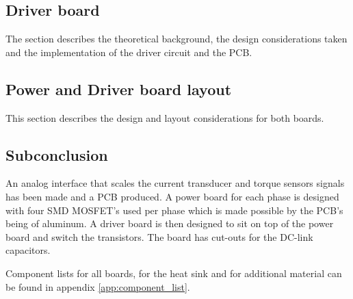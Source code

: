 \subsection{Driver board}
The section describes the theoretical background, the design considerations taken and the implementation of the driver circuit and the PCB.



\subsection{Power and Driver board layout}
This section describes the design and layout considerations for both boards.


\subsection*{Subconclusion}
An analog interface that scales the current transducer and torque sensors signals has been made and a PCB produced. 
A power board for each phase is designed with four SMD MOSFET's used per phase which is made possible by the PCB's being of aluminum. 
A driver board is then designed to sit on top of the power board and switch the transistors. The board has cut-outs for the DC-link capacitors.

Component lists for all boards, for the heat sink and for additional material can be found in appendix \ref{app:component_list}. 


